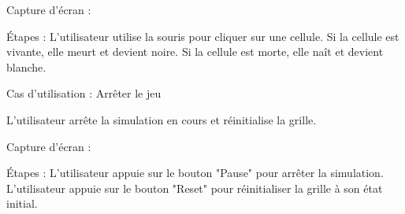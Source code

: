 Capture d'écran :

Étapes :
L'utilisateur utilise la souris pour cliquer sur une cellule.
Si la cellule est vivante, elle meurt et devient noire.
Si la cellule est morte, elle naît et devient blanche.


Cas d'utilisation : Arrêter le jeu

L'utilisateur arrête la simulation en cours et réinitialise la grille.

Capture d'écran :

Étapes :
L'utilisateur appuie sur le bouton "Pause" pour arrêter la simulation.
L'utilisateur appuie sur le bouton "Reset" pour réinitialiser la grille à son état initial.
\newpage
